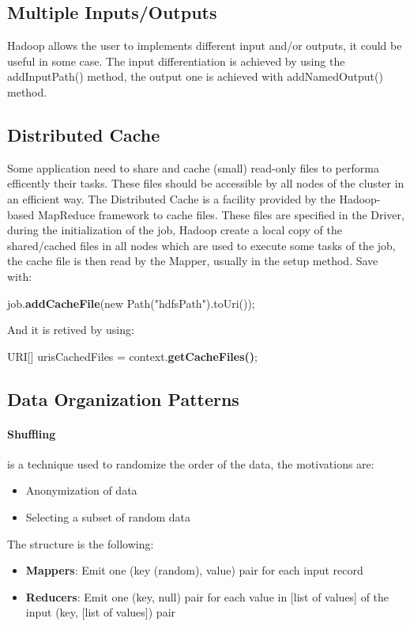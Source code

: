 \documentclass[12pt]{article}
\begin{document}
\subsection{Multiple Inputs/Outputs}
Hadoop allows the user to implements different input and/or outputs, it could be useful in some case. The input differentiation is achieved by using the addInputPath() method, the output one is achieved with addNamedOutput() method.

\subsection{Distributed Cache}
Some application need to share and cache (small) read-only files to performa efficently their tasks. These files should be accessible by all nodes of the cluster in an efficient way. The Distributed Cache is a facility provided by the Hadoop-based MapReduce framework to cache files.
These files are specified in the Driver, during the initialization of the job, Hadoop create a local copy of the shared/cached files in all nodes which are used to execute some tasks of the job, the cache file is then read by the Mapper, usually in the setup method.
Save with:
\begin{center}
  job.\textbf{addCacheFile}(new Path("hdfsPath").toUri());
\end{center}
And it is retived by using:
\begin{center}
  URI[] urisCachedFiles = context.\textbf{getCacheFiles()};
\end{center}

\subsection{Data Organization Patterns}
\paragraph{Shuffling} is a technique used to randomize the order of the data, the motivations are:
\begin{itemize}
  \item Anonymization of data
  \item Selecting a subset of random data
\end{itemize}
The structure is the following:
\begin{itemize}
  \item \textbf{Mappers}: Emit one (key (random), value) pair for each input record
  \item \textbf{Reducers}: Emit one (key, null) pair for each value in [list of values] of the input (key, [list of values]) pair
\end{itemize}
\end{document}
